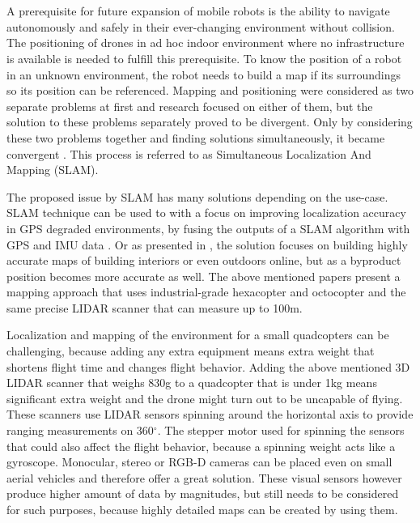 \chapter{\bevezetes}





A prerequisite for future expansion of mobile robots is the ability to navigate autonomously and safely in their ever-changing
environment without collision. The positioning of drones in ad hoc indoor environment where no infrastructure is available is 
needed to fulfill this prerequisite. To know the position of a robot in an unknown environment, the robot needs to build a map
if its surroundings so its position can be referenced. Mapping and positioning were considered as two separate problems 
at first and research focused on either of them, but the solution to these problems separately proved to be divergent. Only 
by considering these two problems together and finding solutions simultaneously, it became convergent 
\cite{durrant2006simultaneous}. This process is referred to as Simultaneous Localization And Mapping (SLAM).

The proposed issue by SLAM has many solutions depending on the use-case. SLAM technique can be used to with a 
focus on improving localization accuracy in GPS degraded environments, by fusing the outputs of a SLAM algorithm with GPS and
IMU data \cite{hening20173d}. Or as presented in \cite{droeschel2018efficient}, the solution focuses on building highly accurate maps
of building interiors or even outdoors online, but as a byproduct position becomes more accurate as well. The above mentioned 
papers present a mapping approach that uses industrial-grade hexacopter and octocopter and the same precise LIDAR scanner that can
measure up to 100m. 

Localization and mapping of the environment for a small quadcopters can be challenging, because adding any extra equipment means
extra weight that shortens flight time and changes flight behavior. Adding the above mentioned 3D LIDAR scanner that weighs 830g
to a quadcopter that is under 1kg means significant extra weight and the drone might turn out to be uncapable of flying. These
scanners use LIDAR sensors spinning around the horizontal axis to provide ranging measurements on 360$^\circ$. The
stepper motor used for spinning the sensors that could also affect the flight behavior, because a spinning weight acts like a 
gyroscope. Monocular, stereo or RGB-D cameras can be placed even on small aerial vehicles and therefore offer a great solution.
These visual sensors however produce higher amount of data by magnitudes, but still needs to be considered for such purposes,
because highly detailed maps can be created by using them.

